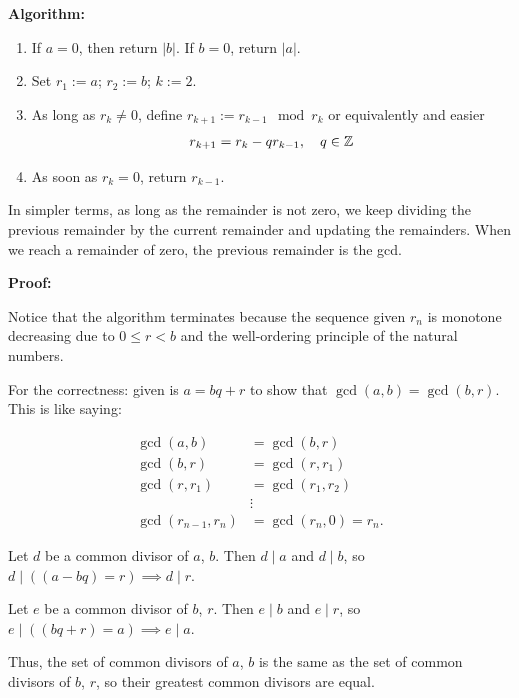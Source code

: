 \textbf{Algorithm:}

\begin{enumerate}

	\item If \(a = 0\), then return \(|b|\). If \(b = 0\), return \(|a|\).

	\item Set \(r_1 := a\); \(r_2 := b\); \(k := 2\).

	\item As long as \(r_k \neq 0\), define \(r_{k+1} := r_{k - 1} \mod r_k\) or equivalently and easier
	      \[
		      r_{k + 1} = r_k - q r_{k - 1}, \quad q \in \mathbb{Z}
	      \]

	\item As soon as \(r_k = 0\), return \(r_{k-1}\).

\end{enumerate}

In simpler terms, as long as the remainder is not zero, we keep dividing the previous remainder by the current
remainder and updating the remainders. When we reach a remainder of zero, the previous remainder is the gcd.

\textbf{Proof:}

Notice that the algorithm terminates because the sequence given \(r_n\) is monotone decreasing due to \(0 \le r < b\) and
the well-ordering principle of the natural numbers.

For the correctness: given is \(a = bq + r\) to show that \(\gcd(a, b) = \gcd(b, r)\). This is like saying:

\begin{align*}
	\gcd(a,b)            & = \gcd(b, r)          \\
	\gcd(b,r)            & = \gcd(r, r_1)        \\
	\gcd(r, r_1)         & = \gcd(r_1, r_2)      \\
	                     & \vdots                \\
	\gcd(r_{n-1}, r_{n}) & = \gcd(r_n, 0) = r_n.
\end{align*}

Let \(d\) be a common divisor of \(a\), \(b\). Then \(d \mid a\) and \(d \mid b\), so \(d \mid ((a - bq) = r) \implies d \mid r \).

Let \(e\) be a common divisor of \(b\), \(r\). Then \(e \mid b\) and \(e \mid r\), so \(e \mid ((bq + r) = a) \implies e \mid a \).

Thus, the set of common divisors of \(a\), \(b\) is the same as the set of common divisors of \(b\), \(r\),
so their greatest common divisors are equal.

